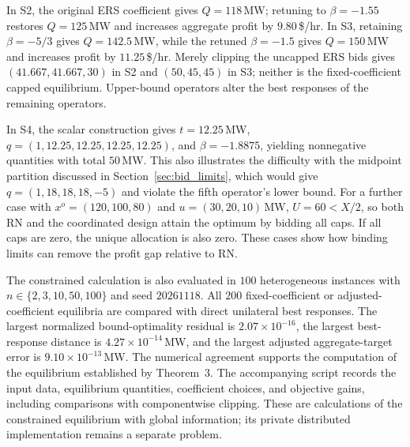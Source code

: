 \documentclass[journal]{IEEEtran}
\begin{document}
In S2, the original ERS coefficient gives $Q=118$\,MW; retuning to $\beta=-1.55$ restores $Q=125$\,MW and increases aggregate profit by $9.80$\,\$/hr. In S3, retaining $\beta=-5/3$ gives $Q=142.5$\,MW, while the retuned $\beta=-1.5$ gives $Q=150$\,MW and increases profit by $11.25$\,\$/hr. Merely clipping the uncapped ERS bids gives $(41.667,41.667,30)$ in S2 and $(50,45,45)$ in S3; neither is the fixed-coefficient capped equilibrium. Upper-bound operators alter the best responses of the remaining operators.

In S4, the scalar construction gives $t=12.25$\,MW, $q=(1,12.25,12.25,12.25,12.25)$, and $\beta=-1.8875$, yielding nonnegative quantities with total $50$\,MW. This also illustrates the difficulty with the midpoint partition discussed in Section~\ref{sec:bid_limits}, which would give $q=(1,18,18,18,-5)$ and violate the fifth operator's lower bound. For a further case with $x^o=(120,100,80)$ and $u=(30,20,10)$\,MW, $U=60<X/2$, so both RN and the coordinated design attain the optimum by bidding all caps. If all caps are zero, the unique allocation is also zero. These cases show how binding limits can remove the profit gap relative to RN.

The constrained calculation is also evaluated in $100$ heterogeneous instances with $n\in\{2,3,10,50,100\}$ and seed $20261118$. All $200$ fixed-coefficient or adjusted-coefficient equilibria are compared with direct unilateral best responses. The largest normalized bound-optimality residual is $2.07\times10^{-16}$, the largest best-response distance is $4.27\times10^{-14}$\,MW, and the largest adjusted aggregate-target error is $9.10\times10^{-13}$\,MW. The numerical agreement supports the computation of the equilibrium established by Theorem~3. The accompanying script records the input data, equilibrium quantities, coefficient choices, and objective gains, including comparisons with componentwise clipping. These are calculations of the constrained equilibrium with global information; its private distributed implementation remains a separate problem.
\end{document}
